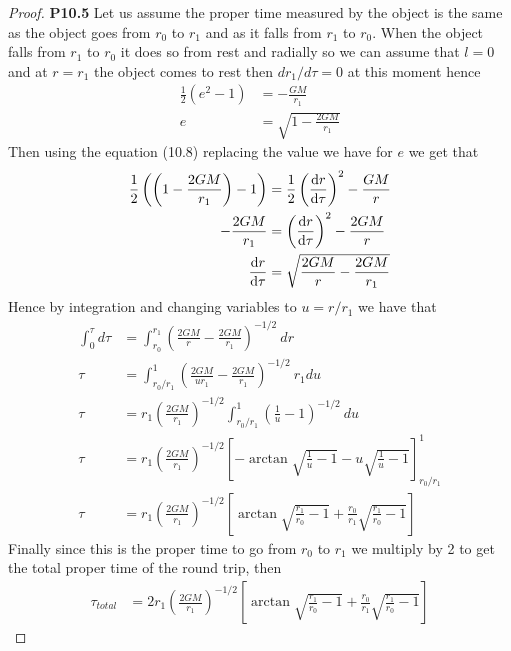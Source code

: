 \documentclass[11pt]{article}
\theoremstyle{definition}
\begin{document}
\cleardoublepage
\begin{proof}{\textbf{P10.5}}
    Let us assume the proper time measured by the object is the same as the
    object goes from $r_0$ to $r_1$ and as it falls from $r_1$ to $r_0$.
    When the object falls from $r_1$ to $r_0$ it does so from rest and 
    radially so we can assume that $l = 0$ and at $r = r_1$ the object comes
    to rest then $dr_1/d\tau = 0$ at this moment hence
    \begin{align*}
        \frac{1}{2}(e^2 - 1) &= -\frac{GM}{r_1}\\
        e &= \sqrt{1 - \frac{2GM}{r_1}}
    \end{align*}
    Then using the equation (10.8) replacing the value we have for $e$ we get
    that
    \begin{align*}
        \frac{1}{2}\left(\left(1 - \frac{2GM}{r_1}\right) - 1\right)
        &= \frac{1}{2}\left(\dv{r}{\tau}\right)^2 - \frac{GM}{r}\\
        - \frac{2GM}{r_1}
        &= \left(\dv{r}{\tau}\right)^2 - \frac{2GM}{r}\\
        \dv{r}{\tau} &= \sqrt{\frac{2GM}{r} - \frac{2GM}{r_1}}
    \end{align*}
    Hence by integration and changing variables to $u = r/r_1$ we have that
    \begin{align*}
        \int_0^\tau d\tau
        &= \int_{r_0}^{r_1} \left(\frac{2GM}{r} - \frac{2GM}{r_1}\right)^{-1/2}~dr\\
        \tau
        &= \int_{r_0/r_1}^{1} \left(\frac{2GM}{ur_1} - \frac{2GM}{r_1}\right)^{-1/2}~r_1du\\
        \tau &= r_1\left(\frac{2GM}{r_1}\right)^{-1/2} \int_{r_0/r_1}^{1}
        \left(\frac{1}{u} - 1\right)^{-1/2}~du\\
        \tau &= r_1\left(\frac{2GM}{r_1}\right)^{-1/2}
        \left[-\arctan\sqrt{\frac{1}{u} - 1} - u\sqrt{\frac{1}{u} - 1}
        \right]_{r_0/r_1}^{1}\\
        \tau &= r_1\left(\frac{2GM}{r_1}\right)^{-1/2}
        \left[\arctan\sqrt{\frac{r_1}{r_0} - 1} + \frac{r_0}{r_1}\sqrt{\frac{r_1}{r_0} - 1}
        \right]
    \end{align*}
    Finally since this is the proper time to go from $r_0$ to $r_1$ we multiply
    by 2 to get the total proper time of the round trip, then
    \begin{align*}
        \tau_{total} &= 2r_1\left(\frac{2GM}{r_1}\right)^{-1/2}
        \left[ \arctan\sqrt{\frac{r_1}{r_0} - 1}
        + \frac{r_0}{r_1}\sqrt{\frac{r_1}{r_0} - 1}\right]
    \end{align*}
\end{proof}
\end{document}
